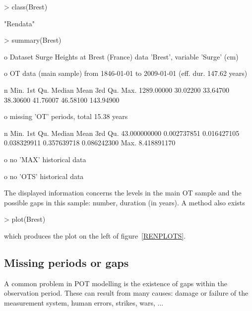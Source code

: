 \documentclass[a4paper]{report}
\begin{document}
\begin{Schunk}
\begin{Sinput}
> class(Brest)
\end{Sinput}
\begin{Soutput}
[1] "Rendata"
\end{Soutput}
\begin{Sinput}
> summary(Brest)
\end{Sinput}
\begin{Soutput}
o Dataset Surge Heights at Brest (France)
   data 'Brest', variable 'Surge' (cm) 

o OT data (main sample) from  1846-01-01  to  2009-01-01  (eff. dur. 147.62 years)
 
         n       Min.    1st Qu.     Median       Mean    3rd Qu.       Max. 
1289.00000   30.02200   33.64700   38.30600   41.76007   46.58100  143.94900 

o missing 'OT' periods, total 15.38 years 

           n         Min.      1st Qu.       Median         Mean      3rd Qu. 
43.000000000  0.002737851  0.016427105  0.038329911  0.357639718  0.086242300 
        Max. 
 8.418891170 

o no 'MAX' historical data 

o no 'OTS' historical data 
\end{Soutput}
\end{Schunk}

\noindent
The displayed information concerns the levels in the main OT sample
and the possible gaps in this sample: number, duration (in years).
A \verb@plot@ method also exists

\begin{Schunk}
\begin{Sinput}
> plot(Brest)
\end{Sinput}
\end{Schunk}

\noindent
which produces the plot on the left of figure~\ref{RENPLOTS}.

%

\subsection{Missing periods or gaps}
% 
%
A common problem in POT modelling is the existence of gaps within the
observation period. These can result from many causes: damage or
failure of the measurement system, human errors, strikes, wars, ...
\end{document}
